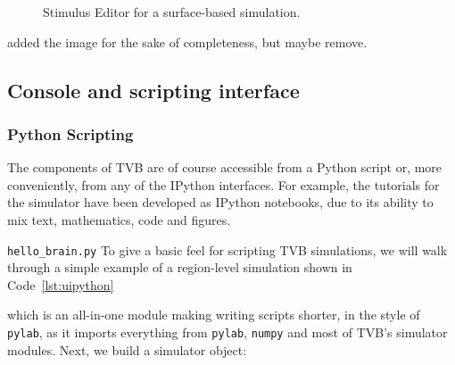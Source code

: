 	\begin{figure}[!htbp]
		\centering
		\caption{Stimulus Editor for a surface-based simulation.}
				\label{fig:stimulus}
	\end{figure}

	\note[psl] added the image for the sake of completeness, but maybe remove.  

\subsection{Console and scripting interface}


\subsubsection{Python Scripting}

The components of TVB are of course accessible from a Python
script or, more conveniently, from any of the IPython interfaces.
For example, the tutorials for the simulator have been developed
as IPython notebooks, due to its ability to mix text, mathematics,
code and figures. 

\texttt{hello\_brain.py}
To give a basic feel for scripting TVB simulations, we will 
walk through a simple example of a region-level simulation shown in
Code~\ref{lst:uipython}





\noindent which is an all-in-one module making writing scripts
shorter, in the style of \texttt{pylab}, as it imports everything
from \texttt{pylab}, \texttt{numpy} and most of TVB's simulator
modules. Next, we build a simulator object:

